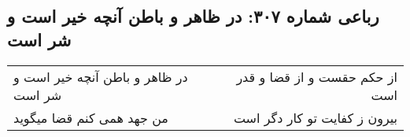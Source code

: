 \begin{center}
\section*{رباعی شماره ۳۰۷: در ظاهر و باطن آنچه خیر است و شر است}
\label{sec:0307}
\begin{longtable}{l p{0.5cm} r}
در ظاهر و باطن آنچه خیر است و شر است
&&
از حکم حقست و از قضا و قدر است
\\
من جهد همی کنم قضا میگوید
&&
بیرون ز کفایت تو کار دگر است
\\
\end{longtable}
\end{center}
